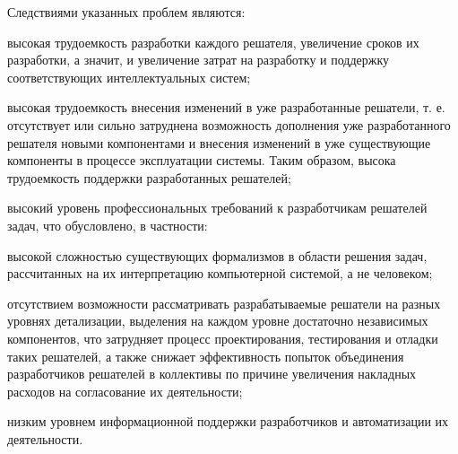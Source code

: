 \begin{SCn}
{Следствиями указанных проблем являются:
\begin{scnitemize}
\item высокая трудоемкость разработки каждого решателя, увеличение сроков их разработки, а значит, и увеличение затрат на разработку и поддержку соответствующих интеллектуальных систем;
\item высокая трудоемкость внесения изменений в уже разработанные решатели, т. е. отсутствует или сильно затруднена возможность дополнения уже разработанного решателя новыми компонентами и внесения изменений в уже существующие компоненты в процессе эксплуатации системы. Таким образом, высока трудоемкость поддержки разработанных решателей;
\item высокий уровень профессиональных требований к разработчикам решателей задач, что обусловлено, в частности:
\begin{scnitemizeii}
\item высокой сложностью существующих формализмов в области решения задач, рассчитанных на их интерпретацию компьютерной системой, а не человеком;
\item отсутствием возможности рассматривать разрабатываемые решатели на разных уровнях детализации, выделения на каждом уровне достаточно независимых компонентов, что затрудняет процесс проектирования, тестирования и отладки таких решателей, а также снижает эффективность попыток объединения разработчиков решателей в коллективы по причине увеличения накладных расходов на согласование их деятельности;
\item низким уровнем информационной поддержки разработчиков и автоматизации их деятельности.
\end{scnitemizeii}
\end{scnitemize}
}







\end{SCn}
